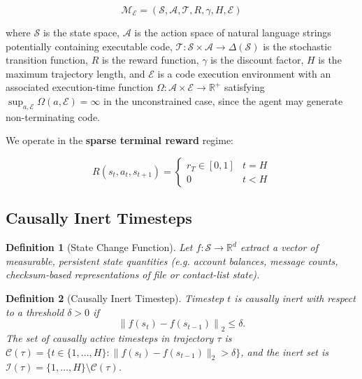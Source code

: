 \documentclass[11pt]{article}
\newtheorem{definition}{Definition}
\begin{document}
\begin{equation}
\mathcal{M}_\mathcal{E} = (\mathcal{S}, \mathcal{A}, \mathcal{T}, R, \gamma, H, \mathcal{E})
\end{equation}

where $\mathcal{S}$ is the state space, $\mathcal{A}$ is the action space of
natural language strings potentially containing executable code,
$\mathcal{T}: \mathcal{S} \times \mathcal{A} \rightarrow \Delta(\mathcal{S})$
is the stochastic transition function, $R$ is the reward function, $\gamma$ is
the discount factor, $H$ is the maximum trajectory length, and $\mathcal{E}$ is
a code execution environment with an associated execution-time function
$\Omega: \mathcal{A} \times \mathcal{E} \rightarrow \mathbb{R}^+$ satisfying
$\sup_{a, \mathcal{E}} \Omega(a, \mathcal{E}) = \infty$ in the unconstrained
case, since the agent may generate non-terminating code.

We operate in the \textbf{sparse terminal reward} regime:

\begin{equation}
R(s_t, a_t, s_{t+1}) = \begin{cases} r_T \in [0,1] & t = H \\ 0 & t < H \end{cases}
\end{equation}

\subsection{Causally Inert Timesteps}

\begin{definition}[State Change Function]
Let $f: \mathcal{S} \rightarrow \mathbb{R}^d$ extract a vector of measurable,
persistent state quantities (e.g. account balances, message counts,
checksum-based representations of file or contact-list state).
\end{definition}

\begin{definition}[Causally Inert Timestep]
\label{def:inert}
Timestep $t$ is causally inert with respect to a threshold $\delta > 0$ if
\begin{equation}
\left\| f(s_t) - f(s_{t-1}) \right\|_2 \leq \delta.
\end{equation}
The set of causally active timesteps in trajectory $\tau$ is
$\mathcal{C}(\tau) = \{ t \in \{1,\ldots,H\} : \|f(s_t) - f(s_{t-1})\|_2 > \delta \}$,
and the inert set is $\mathcal{I}(\tau) = \{1,\ldots,H\} \setminus \mathcal{C}(\tau)$.
\end{definition}
\end{document}
